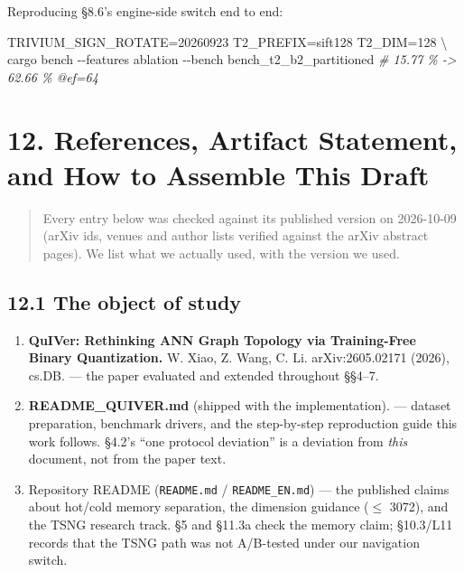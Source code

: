 \documentclass[
  10pt,
]{article}
\newenvironment{Shaded}{}{}
\newcommand{\AttributeTok}[1]{\textcolor[rgb]{0.49,0.56,0.16}{#1}}
\newcommand{\CommentTok}[1]{\textcolor[rgb]{0.38,0.63,0.69}{\textit{#1}}}
\newcommand{\DataTypeTok}[1]{\textcolor[rgb]{0.56,0.13,0.00}{#1}}
\newcommand{\ExtensionTok}[1]{#1}
\newcommand{\NormalTok}[1]{#1}
\newcommand{\OperatorTok}[1]{\textcolor[rgb]{0.40,0.40,0.40}{#1}}
\newcommand{\VariableTok}[1]{\textcolor[rgb]{0.10,0.09,0.49}{#1}}
\providecommand{\tightlist}{%
  \setlength{\itemsep}{0pt}\setlength{\parskip}{0pt}}
\begin{document}
Reproducing §8.6's engine-side switch end to end:

\begin{Shaded}
\begin{Highlighting}[]
\VariableTok{TRIVIUM\_SIGN\_ROTATE}\OperatorTok{=}\NormalTok{20260923 }\VariableTok{T2\_PREFIX}\OperatorTok{=}\NormalTok{sift128 }\VariableTok{T2\_DIM}\OperatorTok{=}\NormalTok{128 }\DataTypeTok{\textbackslash{}}
  \ExtensionTok{cargo}\NormalTok{ bench }\AttributeTok{{-}{-}features}\NormalTok{ ablation }\AttributeTok{{-}{-}bench}\NormalTok{ bench\_t2\_b2\_partitioned   }\CommentTok{\# 15.77 \% {-}\textgreater{} 62.66 \% @ef=64}
\end{Highlighting}
\end{Shaded}

\section{12. References, Artifact Statement, and How to Assemble This
Draft}\label{references-artifact-statement-and-how-to-assemble-this-draft}

\begin{quote}
Every entry below was checked against its published version on
2026-10-09 (arXiv ids, venues and author lists verified against the
arXiv abstract pages). We list what we actually used, with the version
we used.
\end{quote}

\subsection{12.1 The object of study}\label{the-object-of-study}

\begin{enumerate}
\def\labelenumi{\arabic{enumi}.}
\tightlist
\item
  \textbf{QuIVer: Rethinking ANN Graph Topology via Training-Free Binary
  Quantization.} W. Xiao, Z. Wang, C. Li. arXiv:2605.02171 (2026),
  cs.DB. --- the paper evaluated and extended throughout §§4--7.
\item
  \textbf{README\_QUIVER.md} (shipped with the implementation). ---
  dataset preparation, benchmark drivers, and the step-by-step
  reproduction guide this work follows. §4.2's ``one protocol
  deviation'' is a deviation from \emph{this} document, not from the
  paper text.
\item
  Repository README (\texttt{README.md} / \texttt{README\_EN.md}) ---
  the published claims about hot/cold memory separation, the dimension
  guidance ($\leq$ 3072), and the TSNG research track. §5 and §11.3a check
  the memory claim; §10.3/L11 records that the TSNG path was not
  A/B-tested under our navigation switch.
\end{enumerate}
\end{document}
